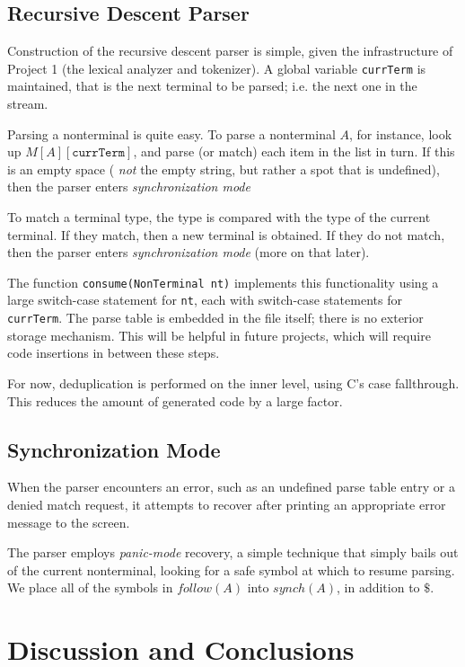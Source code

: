 \documentclass[titlepage]{article}
\begin{document}
		\subsection{Recursive Descent Parser}
		Construction of the recursive descent parser is simple, given the infrastructure of Project 1 (the lexical analyzer and tokenizer). A global variable \texttt{currTerm} is maintained, that is the next terminal to be parsed; i.e. the next one in the stream.

		Parsing a nonterminal is quite easy. To parse a nonterminal $A$, for instance, look up $M[A][\texttt{currTerm}]$, and parse (or match) each item in the list in turn. If this is an empty space ( \textit{not} the empty string, but rather a spot that is undefined), then the parser enters \textit{synchronization mode}

		To match a terminal type, the type is compared with the type of the current terminal. If they match, then a new terminal is obtained. If they do not match, then the parser enters \textit{synchronization mode} (more on that later).

		The function \texttt{consume(NonTerminal nt)} implements this functionality using a large switch-case statement for \texttt{nt}, each with switch-case statements for \texttt{currTerm}. The parse table is embedded in the file itself; there is no exterior storage mechanism. This will be helpful in future projects, which will require code insertions in between these steps.

		For now, deduplication is performed on the inner level, using C's case fallthrough. This reduces the amount of generated code by a large factor.

		\subsection{Synchronization Mode}
		When the parser encounters an error, such as an undefined parse table entry or a denied match request, it attempts to recover after printing an appropriate error message to the screen.

		The parser employs \textit{panic-mode} recovery, a simple technique that simply bails out of the current nonterminal, looking for a safe symbol at which to resume parsing. We place all of the symbols in $follow(A)$ into $synch(A)$, in addition to $\$$.

	\section{Discussion and Conclusions}
\end{document}
